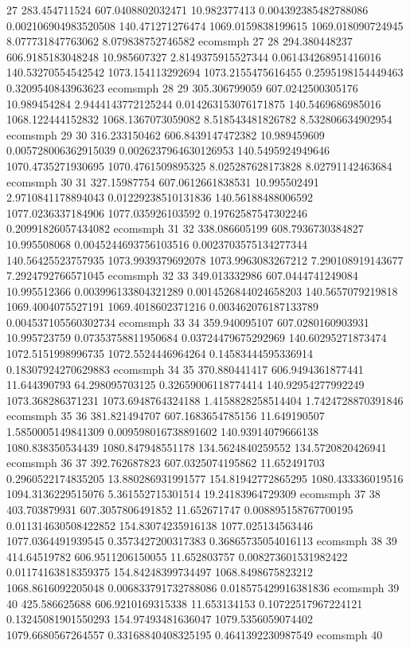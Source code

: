 {27 283.454711524 607.0408802032471 10.982377413 0.004392385482788086 0.002106904983520508 140.471271276474 1069.0159838199615 1069.018090724945 8.077731847763062 8.079838752746582 ecomsmph 27
28 294.380448237 606.9185183048248 10.985607327 2.8149375915527344 0.061434268951416016 140.53270554542542 1073.154113292694 1073.2155475616455 0.2595198154449463 0.3209540843963623 ecomsmph 28
29 305.306799059 607.0242500305176 10.989454284 2.9444143772125244 0.014263153076171875 140.5469686985016 1068.122444152832 1068.1367073059082 8.518543481826782 8.532806634902954 ecomsmph 29
30 316.233150462 606.8439147472382 10.989459609 0.005728006362915039 0.0026237964630126953 140.5495924949646 1070.4735271930695 1070.4761509895325 8.025287628173828 8.02791142463684 ecomsmph 30
31 327.15987754 607.0612661838531 10.995502491 2.9710841178894043 0.01229238510131836 140.56188488006592 1077.0236337184906 1077.035926103592 0.19762587547302246 0.20991826057434082 ecomsmph 31
32 338.086605199 608.7936730384827 10.995508068 0.0045244693756103516 0.0023703575134277344 140.56425523757935 1073.9939379692078 1073.9963083267212 7.290108919143677 7.2924792766571045 ecomsmph 32
33 349.013332986 607.0444741249084 10.995512366 0.003996133804321289 0.0014526844024658203 140.5657079219818 1069.4004075527191 1069.4018602371216 0.003462076187133789 0.004537105560302734 ecomsmph 33
34 359.940095107 607.0280160903931 10.995723759 0.07353758811950684 0.03724479675292969 140.60295271873474 1072.5151998996735 1072.5524446964264 0.14583444595336914 0.18307924270629883 ecomsmph 34
35 370.880441417 606.9494361877441 11.644390793 64.298095703125 0.32659006118774414 140.92954277992249 1073.368286371231 1073.6948764324188 1.4158828258514404 1.7424728870391846 ecomsmph 35
36 381.821494707 607.1683654785156 11.649190507 1.5850005149841309 0.009598016738891602 140.93914079666138 1080.838350534439 1080.847948551178 134.5624840259552 134.5720820426941 ecomsmph 36
37 392.762687823 607.0325074195862 11.652491703 0.2960522174835205 13.880286931991577 154.81942772865295 1080.433336019516 1094.3136229515076 5.361552715301514 19.24183964729309 ecomsmph 37
38 403.703879931 607.3057806491852 11.652671747 0.008895158767700195 0.011314630508422852 154.83074235916138 1077.025134563446 1077.0364491939545 0.3573427200317383 0.36865735054016113 ecomsmph 38
39 414.64519782 606.9511206150055 11.652803757 0.008273601531982422 0.01174163818359375 154.84248399734497 1068.8498675823212 1068.8616092205048 0.006833791732788086 0.018575429916381836 ecomsmph 39
40 425.586625688 606.9210169315338 11.653134153 0.10722517967224121 0.13245081901550293 154.97493481636047 1079.5356059074402 1079.6680567264557 0.33168840408325195 0.4641392230987549 ecomsmph 40
}\tableexpipercellecomsmph
